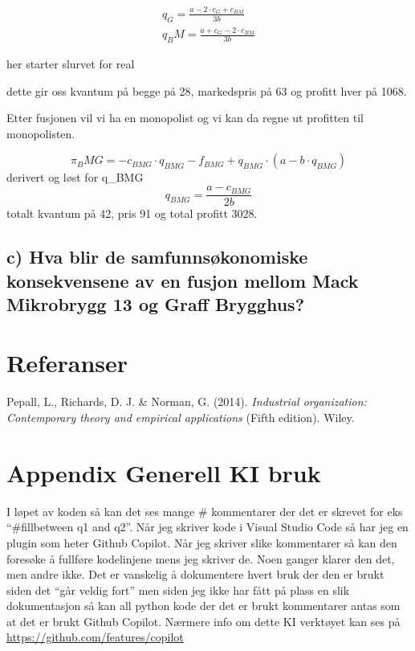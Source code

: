 \documentclass[
  12pt,
  a4paper,
  DIV=11,
  numbers=noendperiod]{scrartcl}
\newlength{\cslhangindent}
\newenvironment{CSLReferences}[2] %
 {\begin{list}{}{%
  \setlength{\itemindent}{0pt}
  \setlength{\leftmargin}{0pt}
  \setlength{\parsep}{0pt}
  \ifodd #1
   \setlength{\leftmargin}{\cslhangindent}
   \setlength{\itemindent}{-1\cslhangindent}
  \fi
  \setlength{\itemsep}{#2\baselineskip}}}
 {\end{list}}
\begin{document}
\begin{align*}
q_G = \frac{a-2\cdot c_G +c_{BM}}{3b} \\
q_BM = \frac{a +c_G - 2\cdot c_{BM}}{3b}
\end{align*}

her starter slurvet for real

dette gir oss kvantum på begge på 28, markedspris på 63 og profitt hver
på 1068.

Etter fusjonen vil vi ha en monopolist og vi kan da regne ut profitten
til monopolisten.

\[
\pi_BMG = -c_{BMG}\cdot q_{BMG} - f_{BMG} + q_{BMG}\cdot (a-b\cdot q_{BMG})
\] derivert og løst for q\_BMG \[
q_{BMG} = \frac{a-c_{BMG}}{2b}
\] totalt kvantum på 42, pris 91 og total profitt 3028.

\clearpage

\subsection{c) Hva blir de samfunnsøkonomiske konsekvensene av en fusjon
mellom Mack Mikrobrygg 13 og Graff
Brygghus?}\label{c-hva-blir-de-samfunnsuxf8konomiske-konsekvensene-av-en-fusjon-mellom-mack-mikrobrygg-13-og-graff-brygghus}

\clearpage

\section{Referanser}\label{referanser}

\label{refs}
\begin{CSLReferences}{1}{0}
Pepall, L., Richards, D. J. \& Norman, G. (2014). \emph{Industrial
organization: Contemporary theory and empirical applications} (Fifth
edition). Wiley.

\end{CSLReferences}

\clearpage

\appendix

\section {Appendix Generell KI bruk}

I løpet av koden så kan det ses mange \# kommentarer der det er skrevet
for eks ``\#fillbetween q1 and q2''. Når jeg skriver kode i Visual
Studio Code så har jeg en plugin som heter Github Copilot. Når jeg
skriver slike kommentarer så kan den foresøke å fullføre kodelinjene
mens jeg skriver de. Noen ganger klarer den det, men andre ikke. Det er
vanskelig å dokumentere hvert bruk der den er brukt siden det ``går
veldig fort'' men siden jeg ikke har fått på plass en slik dokumentasjon
så kan all python kode der det er brukt kommentarer antas som at det er
brukt Github Copilot. Nærmere info om dette KI verktøyet kan ses på
\url{https://github.com/features/copilot}
\end{document}
